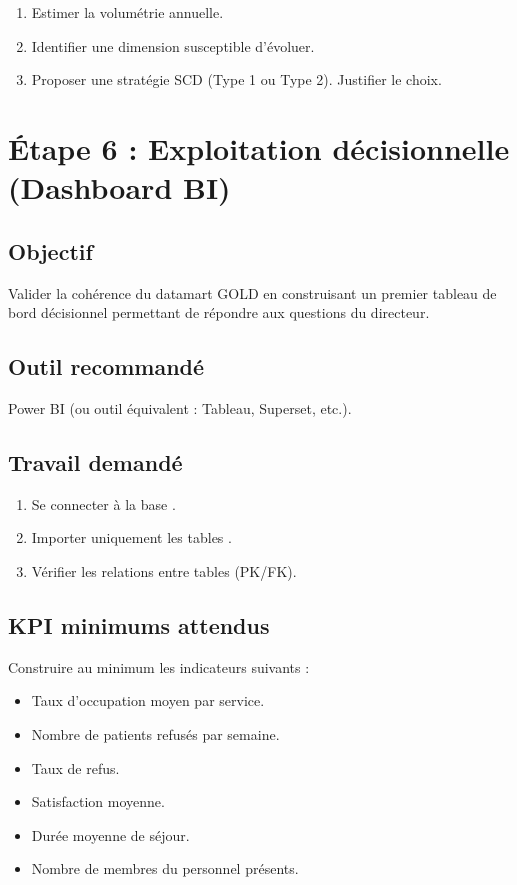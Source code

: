 \documentclass[11pt,a4paper]{article}
\begin{document}
\begin{enumerate}
  \item Estimer la volumétrie annuelle.
  \item Identifier une dimension susceptible d’évoluer.
  \item Proposer une stratégie SCD (Type 1 ou Type 2). Justifier le choix.
\end{enumerate}


\section{Étape 6 : Exploitation décisionnelle (Dashboard BI)}

\subsection*{Objectif}

Valider la cohérence du datamart GOLD en construisant un premier
tableau de bord décisionnel permettant de répondre aux questions
du directeur.

\subsection*{Outil recommandé}

Power BI (ou outil équivalent : Tableau, Superset, etc.).

\subsection*{Travail demandé}

\begin{enumerate}
  \item Se connecter à la base .
  \item Importer uniquement les tables .
  \item Vérifier les relations entre tables (PK/FK).
\end{enumerate}

\subsection*{KPI minimums attendus}

Construire au minimum les indicateurs suivants :

\begin{itemize}
  \item Taux d’occupation moyen par service.
  \item Nombre de patients refusés par semaine.
  \item Taux de refus.
  \item Satisfaction moyenne.
  \item Durée moyenne de séjour.
  \item Nombre de membres du personnel présents.
\end{itemize}
\end{document}
